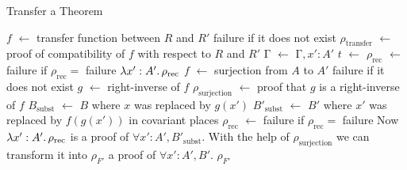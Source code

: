 \documentclass{llncs}
\newcommand*\Let[2]{\State #1 $\gets$ #2}
\begin{document}
\begin{algorithm}
  \caption{Transfer a Theorem
    \label{alg:transfer-simple}}
  \begin{algorithmic}[5]
    \Statex
            \State {}
            \Let{$f$}{transfer function between $R$ and $R'$}
            \State \Comment \Return failure if it does not exist
            \Let{$\rho_{\mathrm{transfer}}$}{proof of compatibility of $f$
            with respect to $R$ and $R'$}
                    \State {}
                \EndIf
            \EndFor
            \State {}
            \Let{$\mathrm{\Gamma}$}{$\mathrm{\Gamma}, x' : A'$}
            \Let{$t$}{}
                \Let{$\rho_{\mathrm{rec}}$}{
                }
                \State \Comment \Return failure if $\rho_{\mathrm{rec}} =$ failure
                \State \Return $\lambda x' : A'\ldotp \rho_{\mathrm{rec}}$
            \Else
                \Let{$f$}{surjection from $A$ to $A'$}
                \Comment \Return failure if it does not exist
                \Let{$g$}{right-inverse of $f$}
                \Let{$\rho_{\mathrm{surjection}}$}{proof that $g$ is a right-inverse of $f$}
                \Let{$B_{\mathrm{subst}}$}{$B$ where $x$ was replaced by $g(x')$}
                \Let{$B'_{\mathrm{subst}}$}{$B'$ where $x'$ was replaced by $f(g(x'))$ in covariant places} \label{line:covariant}
                \Let{$\rho_{\mathrm{rec}}$}{}
                \State \Comment \Return failure if $\rho_{\mathrm{rec}} =$ failure
                \State Now $\lambda x' : A'\ldotp \rho_{\mathrm{rec}}$ is a proof of
                $\forall x' : A', B'_{\mathrm{subst}}$.
                With the help of $\rho_{\mathrm{surjection}}$ we can transform it into $\rho_{F'}$
                a proof of $\forall x' : A', B'$.
                \State \Return $\rho_{F'}$
            \EndIf
        \Else
            \State {}
        \EndIf
    \EndFunction
  \end{algorithmic}
\end{algorithm}
\end{document}

